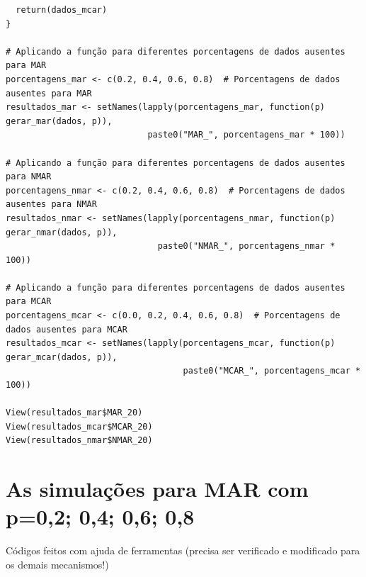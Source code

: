 \documentclass[11pt]{article}
\begin{document}
\begin{verbatim}
  return(dados_mcar)
}

# Aplicando a função para diferentes porcentagens de dados ausentes para MAR
porcentagens_mar <- c(0.2, 0.4, 0.6, 0.8)  # Porcentagens de dados ausentes para MAR
resultados_mar <- setNames(lapply(porcentagens_mar, function(p) gerar_mar(dados, p)), 
                            paste0("MAR_", porcentagens_mar * 100))

# Aplicando a função para diferentes porcentagens de dados ausentes para NMAR
porcentagens_nmar <- c(0.2, 0.4, 0.6, 0.8)  # Porcentagens de dados ausentes para NMAR
resultados_nmar <- setNames(lapply(porcentagens_nmar, function(p) gerar_nmar(dados, p)), 
                              paste0("NMAR_", porcentagens_nmar * 100))

# Aplicando a função para diferentes porcentagens de dados ausentes para MCAR
porcentagens_mcar <- c(0.0, 0.2, 0.4, 0.6, 0.8)  # Porcentagens de dados ausentes para MCAR
resultados_mcar <- setNames(lapply(porcentagens_mcar, function(p) gerar_mcar(dados, p)), 
                                   paste0("MCAR_", porcentagens_mcar * 100))

View(resultados_mar$MAR_20)
View(resultados_mcar$MCAR_20)
View(resultados_nmar$NMAR_20)

\end{verbatim}

\section*{As simulações para MAR com p=0,2; 0,4; 0,6; 0,8}
Códigos feitos com ajuda de ferramentas (precisa ser verificado e modificado para os demais mecanismos!)
\end{document}
